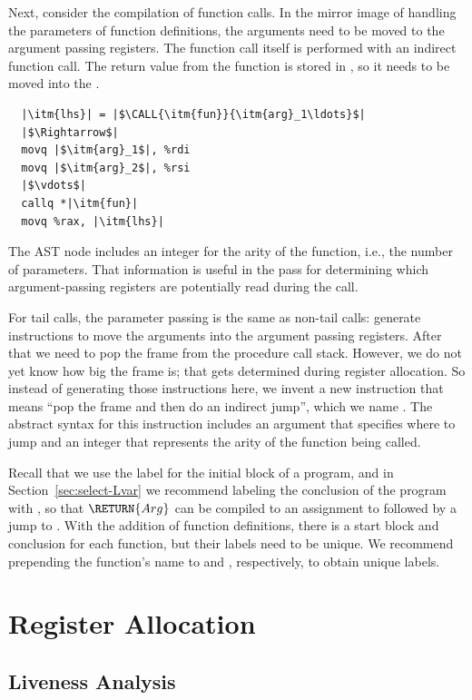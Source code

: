 \documentclass[7x10,nocrop]{TimesAPriori_MIT}%
\begin{document}
Next, consider the compilation of function calls. In the mirror image
of handling the parameters of function definitions, the arguments need
to be moved to the argument passing registers.  The function call
itself is performed with an indirect function call. The return value
from the function is stored in , so it needs to be moved
into the .
\begin{lstlisting}
  |\itm{lhs}| = |$\CALL{\itm{fun}}{\itm{arg}_1\ldots}$|
  |$\Rightarrow$|
  movq |$\itm{arg}_1$|, %rdi
  movq |$\itm{arg}_2$|, %rsi
  |$\vdots$|
  callq *|\itm{fun}|
  movq %rax, |\itm{lhs}|
\end{lstlisting}
The  AST node includes an integer for the arity of
the function, i.e., the number of parameters. That information is
useful in the  pass for determining which
argument-passing registers are potentially read during the call.

For tail calls, the parameter passing is the same as non-tail calls:
generate instructions to move the arguments into the argument
passing registers.  After that we need to pop the frame from the
procedure call stack.  However, we do not yet know how big the frame
is; that gets determined during register allocation. So instead of
generating those instructions here, we invent a new instruction that
means ``pop the frame and then do an indirect jump'', which we name
. The abstract syntax for this instruction includes an
argument that specifies where to jump and an integer that represents
the arity of the function being called.

Recall that we use the label  for the initial block of a
program, and in Section~\ref{sec:select-Lvar} we recommend labeling
the conclusion of the program with , so that
$\RETURN{Arg}$ can be compiled to an assignment to  followed
by a jump to . With the addition of function
definitions, there is a start block and conclusion for each function,
but their labels need to be unique. We recommend prepending the
function's name to  and , respectively,
to obtain unique labels.


\section{Register Allocation}
\label{sec:register-allocation-r4}


\subsection{Liveness Analysis}
\label{sec:liveness-analysis-r4}
\end{document}
